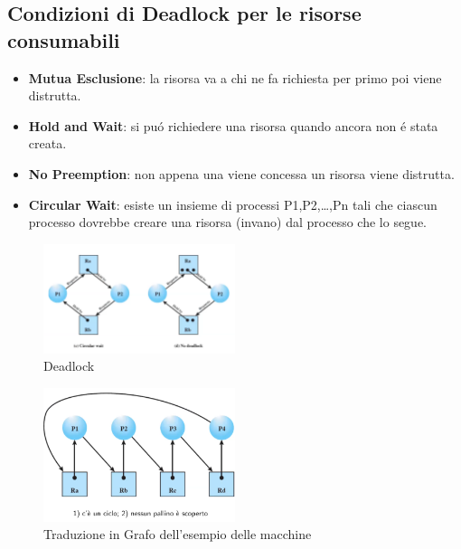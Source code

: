 \subsection{Condizioni di Deadlock per le risorse consumabili}
\begin{itemize}
    \item \textbf{Mutua Esclusione}: la risorsa va a chi ne fa richiesta per primo poi viene distrutta.
    \item \textbf{Hold and Wait}: si puó richiedere una risorsa quando ancora non é stata creata.
    \item \textbf{No Preemption}: non appena una viene concessa un risorsa viene distrutta.
    \item \textbf{Circular Wait}: esiste un insieme di processi P1,P2,\dots,Pn tali che ciascun processo dovrebbe creare una risorsa (invano) dal processo che lo segue.
\end{itemize}
\begin{figure}[H]
    \centering
    \includegraphics[width=0.5\textwidth]{immagini/GrafoAllocazioneDelleRisorseEsempio}
    \caption{Deadlock}
\end{figure}
\begin{figure}[H]
    \centering
    \includegraphics[width=0.5\textwidth]{immagini/GrafoAllocazioneDeiProcessiEsempioVitaComune}
    \caption{Traduzione in Grafo dell'esempio delle macchine}
\end{figure}
